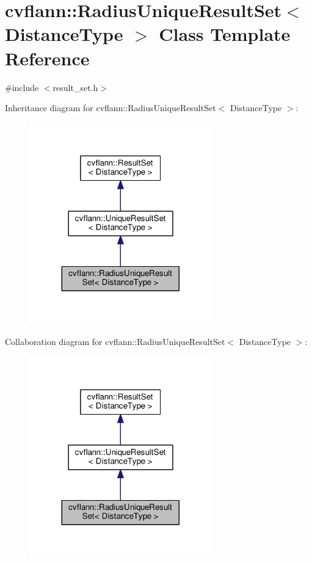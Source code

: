 \hypertarget{classcvflann_1_1RadiusUniqueResultSet}{\section{cvflann\-:\-:Radius\-Unique\-Result\-Set$<$ Distance\-Type $>$ Class Template Reference}
\label{classcvflann_1_1RadiusUniqueResultSet}
}


{\ttfamily \#include $<$result\-\_\-set.\-h$>$}



Inheritance diagram for cvflann\-:\-:Radius\-Unique\-Result\-Set$<$ Distance\-Type $>$\-:\nopagebreak
\begin{figure}[H]
\begin{center}
\leavevmode
\includegraphics[width=224pt]{classcvflann_1_1RadiusUniqueResultSet__inherit__graph}
\end{center}
\end{figure}


Collaboration diagram for cvflann\-:\-:Radius\-Unique\-Result\-Set$<$ Distance\-Type $>$\-:\nopagebreak
\begin{figure}[H]
\begin{center}
\leavevmode
\includegraphics[width=224pt]{classcvflann_1_1RadiusUniqueResultSet__coll__graph}
\end{center}
\end{figure}

